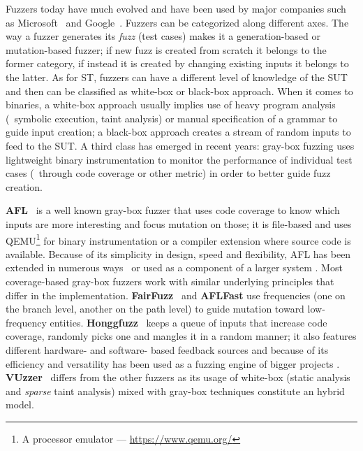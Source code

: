Fuzzers today have much evolved and have been used by major companies such as
Microsoft~\cite{godefroid2008grammar} and
Google~\cite{google2016fuzz,google2011fuzz,google2016oss,google2017oss}. Fuzzers
can be categorized along different axes. The way a fuzzer generates its
\emph{fuzz} (test cases) makes it a generation-based or mutation-based fuzzer;
if new fuzz is created from scratch it belongs to the former category, if
instead it is created by changing existing inputs it belongs to the latter. As
for \ac{ST}, fuzzers can have a different level of knowledge of the \ac{SUT} and
then can be classified as white-box or black-box approach.  When it comes to
binaries, a white-box approach usually implies use of heavy program analysis
(\eg~symbolic execution, taint analysis) or manual specification of a grammar to
guide input creation; a black-box approach creates a stream of random inputs to
feed to the \ac{SUT}. A third class has emerged in recent years: gray-box
fuzzing uses lightweight binary instrumentation to monitor the performance of
individual test cases (\eg~through code coverage or other metric) in order to
better guide fuzz creation.

\textbf{AFL}~\cite{afl} is a well known gray-box fuzzer that uses code coverage
to know which inputs are more interesting and focus mutation on those; it is
file-based and uses QEMU\footnote{A processor emulator ---
\url{https://www.qemu.org/}} for binary instrumentation or a compiler extension
where source code is available.  Because of its simplicity in design, speed and
flexibility, AFL has been extended in numerous
ways~\cite{bohme2017coverage,bohme2017directed,lemieux2017fairfuzz} or used as a
component of a larger system
\cite{stephens2016driller,nichols2017faster,li2017steelix}. Most coverage-based
gray-box fuzzers work with similar underlying principles that differ in the
implementation. \textbf{FairFuzz}~\cite{lemieux2017fairfuzz} and \textbf{AFLFast}
\cite{bohme2017coverage} use frequencies (one on the branch level, another on
the path level) to guide mutation toward low-frequency entities.
\textbf{Honggfuzz}~\cite{honggfuzz} keeps a queue of inputs that increase code
coverage, randomly picks one and mangles it in a random manner; it also features
different hardware- and software- based feedback sources and because of its
efficiency and versatility has been used as a fuzzing engine of bigger projects
\cite{grieco2016quickfuzz}. \textbf{VUzzer}~\cite{rawat2017vuzzer} differs from
the other fuzzers as its usage of white-box (static analysis and \emph{sparse}
taint analysis) mixed with gray-box techniques constitute an hybrid model.



